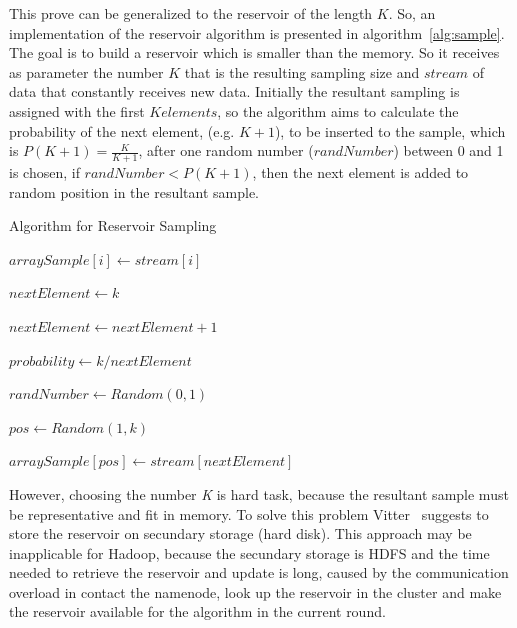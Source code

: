 This prove can be generalized to the reservoir of the length $K$. So, an implementation
of the reservoir algorithm is presented in algorithm~\ref{alg:sample}.
The goal is to build a reservoir which is smaller than the memory. So
it receives as parameter the number $K$ that is the resulting sampling size
and $stream$ of data that constantly receives new data. Initially the resultant
sampling is assigned with the first $K elements$, so the algorithm
aims to calculate the probability of the next element, (e.g. $K+1$), to be inserted
to the sample, which is $P(K+1) = \frac{K}{K+1}$, after one random number ($randNumber$)
between 0 and 1 is chosen, if $randNumber < P(K+1)$, then the next element
is added to random position in the resultant sample.

\begin{algorithm}
		\caption{Algorithm for Reservoir Sampling \label{alg:sample}}


		 {
			$arraySample[i] \leftarrow stream[i]$
		}

		$nextElement \leftarrow k$

		 {
			$nextElement \leftarrow nextElement + 1$

            $probability \leftarrow k/nextElement$

			$randNumber \leftarrow Random(0,1)$

			{
                $pos \leftarrow Random(1,k)$

				$arraySample[pos] \leftarrow stream[nextElement]$
			}
		}

\end{algorithm}



However, choosing the number {\it K} is hard task, because the resultant sample must
be representative and fit in memory. To solve this problem Vitter~\cite{vitter:1985}
suggests to store the reservoir on secundary storage (hard disk). This
approach may be inapplicable for Hadoop, because the secundary storage
is HDFS and the time needed to retrieve the reservoir and update is long, caused
by the communication overload in contact the namenode, look up the reservoir
in the cluster and make the reservoir available for the algorithm in the current
round.

